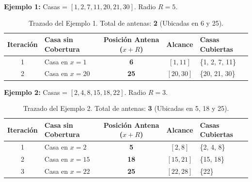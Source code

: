 \documentclass[11pt, a4paper]{article}
\begin{document}
\textbf{Ejemplo 1:} Casas = $[1, 2, 7, 11, 20, 21, 30]$. Radio $R = 5$.
\begin{table}[htbp]
\centering
\begin{tabular}{clccl}
\toprule
\textbf{Iteración} & \textbf{Casa sin Cobertura} & \textbf{Posición Antena ($x+R$)} & \textbf{Alcance} & \textbf{Casas Cubiertas} \\
\midrule
1 & Casa en $x=1$  & \textbf{6}  & $[1, 11]$ & \{1, 2, 7, 11\} \\
2 & Casa en $x=20$ & \textbf{25} & $[20, 30]$ & \{20, 21, 30\} \\
\bottomrule
\end{tabular}
\caption{Trazado del Ejemplo 1. Total de antenas: \textbf{2} (Ubicadas en 6 y 25).}
\end{table}

\textbf{Ejemplo 2:} Casas = $[2, 4, 8, 15, 18, 22]$. Radio $R = 3$.
\begin{table}[htbp]
\centering
\begin{tabular}{clccl}
\toprule
\textbf{Iteración} & \textbf{Casa sin Cobertura} & \textbf{Posición Antena ($x+R$)} & \textbf{Alcance} & \textbf{Casas Cubiertas} \\
\midrule
1 & Casa en $x=2$  & \textbf{5}  & $[2, 8]$   & \{2, 4, 8\} \\
2 & Casa en $x=15$ & \textbf{18} & $[15, 21]$ & \{15, 18\} \\
3 & Casa en $x=22$ & \textbf{25} & $[22, 28]$ & \{22\} \\
\bottomrule
\end{tabular}
\caption{Trazado del Ejemplo 2. Total de antenas: \textbf{3} (Ubicadas en 5, 18 y 25).}
\end{table}
\end{document}
